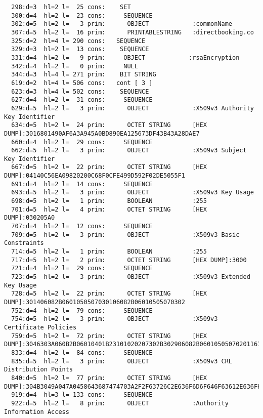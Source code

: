 \documentclass[a4paper,11pt]{article}
\theoremstyle{mytheor}
\begin{document}
\begin{lstlisting}
  298:d=3  hl=2 l=  25 cons:    SET               
  300:d=4  hl=2 l=  23 cons:     SEQUENCE          
  302:d=5  hl=2 l=   3 prim:      OBJECT            :commonName
  307:d=5  hl=2 l=  16 prim:      PRINTABLESTRING   :directbooking.co
  325:d=2  hl=4 l= 290 cons:   SEQUENCE          
  329:d=3  hl=2 l=  13 cons:    SEQUENCE          
  331:d=4  hl=2 l=   9 prim:     OBJECT            :rsaEncryption
  342:d=4  hl=2 l=   0 prim:     NULL              
  344:d=3  hl=4 l= 271 prim:    BIT STRING        
  619:d=2  hl=4 l= 506 cons:   cont [ 3 ]        
  623:d=3  hl=4 l= 502 cons:    SEQUENCE          
  627:d=4  hl=2 l=  31 cons:     SEQUENCE          
  629:d=5  hl=2 l=   3 prim:      OBJECT            :X509v3 Authority Key Identifier
  634:d=5  hl=2 l=  24 prim:      OCTET STRING      [HEX DUMP]:3016801490AF6A3A945A0BD890EA125673DF43B43A28DAE7
  660:d=4  hl=2 l=  29 cons:     SEQUENCE          
  662:d=5  hl=2 l=   3 prim:      OBJECT            :X509v3 Subject Key Identifier
  667:d=5  hl=2 l=  22 prim:      OCTET STRING      [HEX DUMP]:04140C56EA09820200C68F0CFE499D592F02DE5055F1
  691:d=4  hl=2 l=  14 cons:     SEQUENCE          
  693:d=5  hl=2 l=   3 prim:      OBJECT            :X509v3 Key Usage
  698:d=5  hl=2 l=   1 prim:      BOOLEAN           :255
  701:d=5  hl=2 l=   4 prim:      OCTET STRING      [HEX DUMP]:030205A0
  707:d=4  hl=2 l=  12 cons:     SEQUENCE          
  709:d=5  hl=2 l=   3 prim:      OBJECT            :X509v3 Basic Constraints
  714:d=5  hl=2 l=   1 prim:      BOOLEAN           :255
  717:d=5  hl=2 l=   2 prim:      OCTET STRING      [HEX DUMP]:3000
  721:d=4  hl=2 l=  29 cons:     SEQUENCE          
  723:d=5  hl=2 l=   3 prim:      OBJECT            :X509v3 Extended Key Usage
  728:d=5  hl=2 l=  22 prim:      OCTET STRING      [HEX DUMP]:301406082B0601050507030106082B06010505070302
  752:d=4  hl=2 l=  79 cons:     SEQUENCE          
  754:d=5  hl=2 l=   3 prim:      OBJECT            :X509v3 Certificate Policies
  759:d=5  hl=2 l=  72 prim:      OCTET STRING      [HEX DUMP]:3046303A060B2B06010401B23101020207302B302906082B06010505070201161D68747470733A2F2F7365637572652E636F6D6F646F2E636F6D2F4350533008060667810C010201
  833:d=4  hl=2 l=  84 cons:     SEQUENCE          
  835:d=5  hl=2 l=   3 prim:      OBJECT            :X509v3 CRL Distribution Points
  840:d=5  hl=2 l=  77 prim:      OCTET STRING      [HEX DUMP]:304B3049A047A0458643687474703A2F2F63726C2E636F6D6F646F63612E636F6D2F434F4D4F444F525341446F6D61696E56616C69646174696F6E53656375726553657276657243412E63726C
  919:d=4  hl=3 l= 133 cons:     SEQUENCE          
  922:d=5  hl=2 l=   8 prim:      OBJECT            :Authority Information Access

\end{lstlisting}
\end{document}
